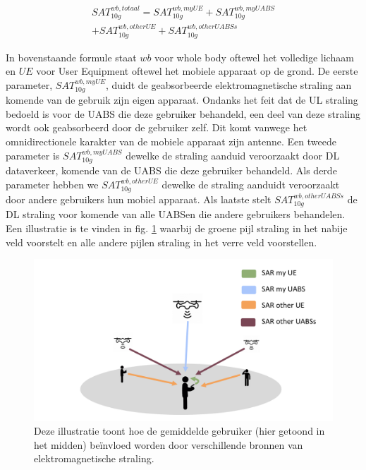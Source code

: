 \documentclass[twocolumn]{phdsymp_dutch}
\begin{document}
\begin{equation} 
\begin{aligned}
SAT^{wb,totaal}_{10g} = SAT^{wb,myUE}_{10g} +  SAT^{wb,myUABS}_{10g} \\
+ SAT^{wb,otherUE}_{10g} + SAT^{wb,otherUABSs}_{10g}
\end{aligned}
\label{eq:overallSARwb}
\end{equation}

In bovenstaande formule staat $wb$ voor whole body oftewel het volledige lichaam en $UE$ voor User Equipment oftewel het mobiele apparaat op de grond.
De eerste parameter, $SAT^{wb,myUE}_{10g}$, duidt de geabsorbeerde elektromagnetische straling aan komende van de gebruik zijn eigen apparaat.
Ondanks het feit dat de \gls{UL} straling bedoeld is voor de \gls{UABS} die deze gebruiker behandeld,
een deel van deze straling wordt ook geabsorbeerd door de gebruiker zelf. 
Dit komt vanwege het omnidirectionele karakter van de mobiele apparaat zijn antenne.
Een tweede parameter is $SAT^{wb,myUABS}_{10g}$ dewelke de straling aanduid veroorzaakt door \gls{DL} dataverkeer, komende van de \gls{UABS} die deze gebruiker behandeld.
Als derde parameter hebben we $SAT^{wb,otherUE}_{10g}$ dewelke de straling aanduidt veroorzaakt door andere gebruikers hun mobiel apparaat.
Als laatste stelt $SAT^{wb,otherUABSs}_{10g}$ de \gls{DL} straling voor komende van alle \gls{UABS}en die andere gebruikers behandelen.
Een illustratie is te vinden in fig. \ref{fig:networkIllustration} waarbij de groene pijl straling in het nabije veld voorstelt en alle andere 
pijlen straling in het verre veld voorstellen.

\begin{figure}[h!]
\centering
  \includegraphics[width=\linewidth]{networkIllustrationSARSources.png}
  \caption{Deze illustratie toont hoe de gemiddelde gebruiker (hier getoond in het midden) be\"invloed worden door verschillende bronnen van elektromagnetische straling.}
  \label{fig:networkIllustration}
\end{figure}
\end{document}
